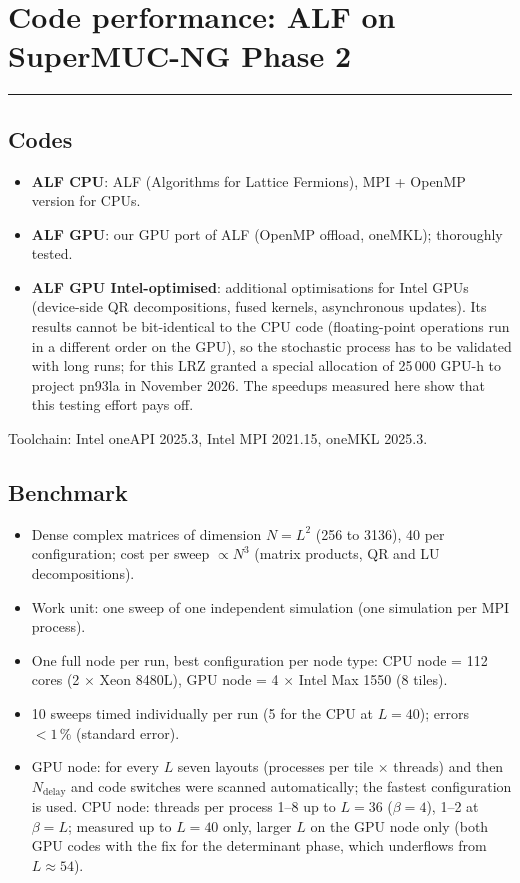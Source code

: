 \documentclass[11pt]{article}
\newcommand{\gcssection}[1]{\section*{#1}\vspace{-1.5ex}\noindent\rule{\textwidth}{0.4pt}\par}
\begin{document}
\gcssection{Code performance: ALF on SuperMUC-NG Phase 2}

\subsection*{Codes}
\begin{itemize}
\item \textbf{ALF CPU}: ALF (Algorithms for Lattice Fermions), MPI + OpenMP version for CPUs.
\item \textbf{ALF GPU}: our GPU port of ALF (OpenMP offload, oneMKL); thoroughly tested.
\item \textbf{ALF GPU Intel-optimised}: additional optimisations for Intel GPUs (device-side QR decompositions, fused
  kernels, asynchronous updates). Its results cannot be bit-identical to the CPU code (floating-point operations run in a different order on the GPU), so the stochastic process has to be
  validated with long runs; for this LRZ granted a special allocation of 25\,000 GPU-h to project pn93la in November 2026.
  The speedups measured here show that this testing effort pays off.
\end{itemize}
Toolchain: Intel oneAPI 2025.3, Intel MPI 2021.15, oneMKL 2025.3.

\subsection*{Benchmark}
\begin{itemize}
\item Dense complex matrices of dimension $N=L^2$ (256 to 3136), 40 per configuration; cost per sweep $\propto N^3$
  (matrix products, QR and LU decompositions).
\item Work unit: one sweep of one independent simulation (one simulation per MPI process).
\item One full node per run, best configuration per node type: CPU node = 112 cores (2 $\times$ Xeon 8480L),
  GPU node = 4 $\times$ Intel Max 1550 (8 tiles).
\item 10 sweeps timed individually per run (5 for the CPU at $L=40$); errors $<1\,\%$ (standard error).
\item GPU node: for every $L$ seven layouts (processes per tile $\times$ threads) and then $N_\text{delay}$ and code switches were scanned automatically; the fastest configuration is used. CPU node: threads per process 1--8 up to $L=36$ ($\beta=4$), 1--2 at $\beta=L$; measured up to $L=40$ only, larger $L$ on the GPU node only (both GPU codes with the fix for the determinant phase, which underflows from $L\approx54$).
\end{itemize}
\end{document}
